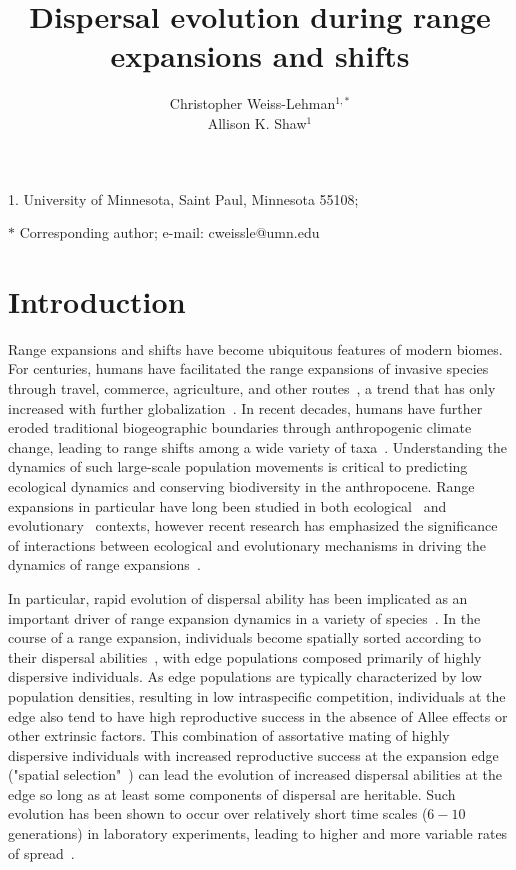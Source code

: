 \documentclass[11pt]{article}
\title{Dispersal evolution during range expansions and shifts}
\author{Christopher Weiss-Lehman$^{1,\ast}$ \\ 
Allison K. Shaw$^{1}$}
\date{}
\begin{document}
\maketitle

\noindent{} 1. University of Minnesota, Saint Paul, Minnesota 55108;

\noindent{} $\ast$ Corresponding author; e-mail: cweissle@umn.edu

\bigskip


\linenumbers{}
\modulolinenumbers[3]

\newpage{}

\section*{Introduction}
Range expansions and shifts have become ubiquitous features of modern biomes. For centuries, humans have facilitated the range expansions of invasive species through travel, commerce, agriculture, and other routes~\citep{elton1958ecology}, a trend that has only increased with further globalization~\citep{hulme2009trade}. In recent decades, humans have further eroded traditional biogeographic boundaries through anthropogenic climate change, leading to range shifts among a wide variety of taxa~\citep{parmesan2006ecological}. Understanding the dynamics of such large-scale population movements is critical to predicting ecological dynamics and conserving biodiversity in the anthropocene. Range expansions in particular have long been studied in both ecological~\citep{skellam1951random} and evolutionary~\citep{fisher1937wave} contexts, however recent research has emphasized the significance of interactions between ecological and evolutionary mechanisms in driving the dynamics of range expansions~\citep{shaw2015dispersal, burton2010trade, phillips2006invasion}.

In particular, rapid evolution of dispersal ability has been implicated as an important driver of range expansion dynamics in a variety of species~\citep{weiss2017rapid, ochocki2017rapid, williams2016rapid, alex2013evolution, fronhofer2015eco}. In the course of a range expansion, individuals become spatially sorted according to their dispersal abilities~\citep{shine2011evolutionary}, with edge populations composed primarily of highly dispersive individuals. As edge populations are typically characterized by low population densities, resulting in low intraspecific competition, individuals at the edge also tend to have high reproductive success in the absence of Allee effects or other extrinsic factors. This combination of assortative mating of highly dispersive individuals with increased reproductive success at the expansion edge ("spatial selection"~\citep{phillips2010life}) can lead the evolution of increased dispersal abilities at the edge so long as at least some components of dispersal are heritable. Such evolution has been shown to occur over relatively short time scales ($6-10$ generations) in laboratory experiments, leading to higher and more variable rates of spread~\citep{weiss2017rapid, ochocki2017rapid, williams2016rapid}. 
\end{document}
